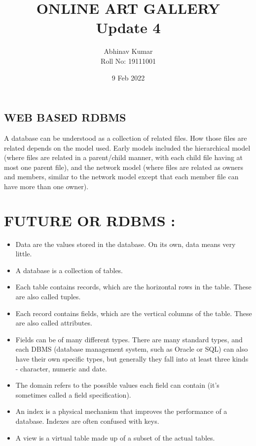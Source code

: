 \documentclass{article}
\title{ONLINE ART GALLERY \\ Update 4}
\date{9 Feb 2022}
\author{Abhinav Kumar \\ Roll No: 19111001 }
\begin{document}
\maketitle
\begin{center}
   \section*{\textbf{WEB BASED RDBMS}} 
\end{center}
A database can be understood as a collection of related files. How those files are related depends on the model used. Early models included the hierarchical model (where files are related in a parent/child manner, with each child file having at most one parent file), and the network model (where files are related as owners and members, similar to the network model except that each member file can have more than one owner).
\\
\section*{FUTURE OR RDBMS : }
\begin{itemize}
    \item Data are the values stored in the database. On its own, data means very little.
\item  A database is a collection of tables.
\item Each table contains records, which are the horizontal rows in the table. These are also called tuples.
\item Each record contains fields, which are the vertical columns of the table. These are also called attributes.
\item Fields can be of many different types. There are many standard types, and each DBMS (database management system, such as Oracle or SQL) can also have their own specific types, but generally they fall into at least three kinds - character, numeric and date.
\item The domain refers to the possible values each field can contain (it's sometimes called a field specification).
\item An index is a physical mechanism that improves the performance of a database. Indexes are often confused with keys.
\item A view is a virtual table made up of a subset of the actual tables.
\end{itemize}
\end{document}
